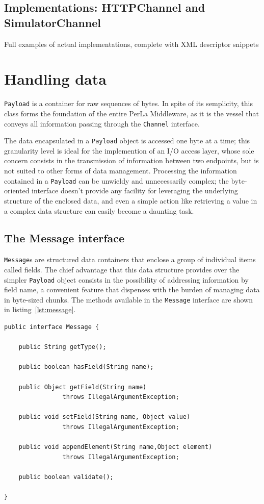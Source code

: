 \subsection{Implementations: HTTPChannel and SimulatorChannel}
\label{sec:channel.implementations}

Full examples of actual implementations, complete with XML descriptor snippets


\section{Handling data}
\label{sec:components.mapper}

\texttt{Payload} is a container for raw sequences of bytes. In spite of its
semplicity, this class forms the foundation of the entire PerLa Middleware, as
it is the vessel that conveys all information passing through the
\texttt{Channel} interface.

The data encapsulated in a \texttt{Payload} object is accessed one byte at a
time; this granularity level is ideal for the implemention of an I/O access
layer, whose sole concern consists in the transmission of information between
two endpoints, but is not suited to other forms of data management. Processing
the information contained in a \texttt{Payload} can be unwieldy and
unnecessarily complex; the byte-oriented interface doesn't provide any facility
for leveraging the underlying structure of the enclosed data, and even a simple
action like retrieving a value in a complex data structure can easily become a
daunting task.


\subsection{The Message interface}

\texttt{Message}s are structured data containers that enclose a group of
individual items called fields. The chief advantage that this data structure
provides over the simpler \texttt{Payload} object consists in the possibility
of addressing information by field name, a convenient feature that dispenses
with the burden of managing data in byte-sized chunks. The methods available in
the \texttt{Message} interface are shown in listing~\ref{lst:message}.

\lstset{language=Java}
\begin{lstlisting}[float,floatplacement=!hbt,caption=The Message
interface,label={lst:message}]
public interface Message {

    public String getType();

    public boolean hasField(String name);

    public Object getField(String name)
                throws IllegalArgumentException;

    public void setField(String name, Object value)
                throws IllegalArgumentException;

    public void appendElement(String name,Object element)
                throws IllegalArgumentException;

    public boolean validate();

}
\end{lstlisting}

